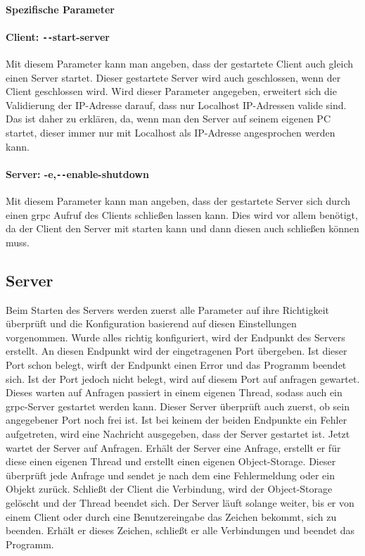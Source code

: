 \documentclass[a4paper,12pt,titlepage]{scrartcl}
\begin{document}
\paragraph{Spezifische Parameter}


\paragraph{Client: \texttt{-{}-}start-server}
Mit diesem Parameter kann man angeben, dass der gestartete Client auch gleich einen Server startet. Dieser gestartete Server wird auch geschlossen, wenn der Client geschlossen wird. Wird dieser Parameter angegeben, erweitert sich die Validierung der IP-Adresse darauf, dass nur Localhost IP-Adressen valide sind. Das ist daher zu erklären, da, wenn man den Server auf seinem eigenen PC startet, dieser immer nur mit Localhost als IP-Adresse angesprochen werden kann.


\paragraph{Server: -e,\texttt{-{}-}enable-shutdown}
Mit diesem Parameter kann man angeben, dass der gestartete Server sich durch einen grpc Aufruf des Clients schließen lassen kann. Dies wird vor allem benötigt, da der Client den Server mit starten kann und dann diesen auch schließen können muss.


\subsection{Server}
Beim Starten des Servers werden zuerst alle Parameter auf ihre Richtigkeit überprüft und die Konfiguration basierend auf diesen Einstellungen vorgenommen. Wurde alles richtig konfiguriert, wird der Endpunkt des Servers erstellt. An diesen Endpunkt wird der eingetragenen Port übergeben. Ist dieser Port schon belegt, wirft der Endpunkt einen Error und das Programm beendet sich. Ist der Port jedoch nicht belegt, wird auf diesem Port auf anfragen gewartet. Dieses warten auf Anfragen passiert in einem eigenen Thread, sodass auch ein grpc-Server gestartet werden kann. Dieser Server überprüft auch zuerst, ob sein angegebener Port noch frei ist. Ist bei keinem der beiden Endpunkte ein Fehler aufgetreten, wird eine Nachricht ausgegeben, dass der Server gestartet ist. Jetzt wartet der Server auf Anfragen. Erhält der Server eine Anfrage, erstellt er für diese einen eigenen Thread und erstellt einen eigenen Object-Storage. Dieser überprüft jede Anfrage und sendet je nach dem eine Fehlermeldung oder ein Objekt zurück. Schließt der Client die Verbindung, wird der Object-Storage gelöscht und der Thread beendet sich. Der Server läuft solange weiter, bis er von einem Client oder durch eine Benutzereingabe das Zeichen bekommt, sich zu beenden. Erhält er dieses Zeichen, schließt er alle Verbindungen und beendet das Programm.
\end{document}
